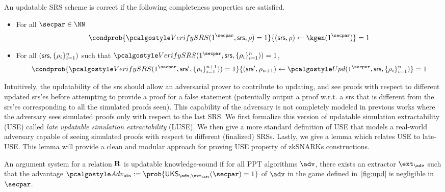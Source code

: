 \begin{definition}
	An updatable SRS scheme is correct if the following completeness properties are satisfied.
	
	\begin{itemize}
		
		\item
		For all $\secpar \in \NN$
		\[
		\condprob{\verifyCRS(1^\secpar,\srs,\rho) = 1}{(\srs,\rho) \leftarrow \kgen(1^\secpar)} = 1
		\]
		\item
		
		For all $(\mathsf{srs},\{\rho_i \}_{i=1}^n)$ such that $\verifyCRS(1^\secpar,\srs,\{\rho_i \}_{i=1}^n))=1$,
		\[
		\condprob{\verifyCRS(1^\secpar,\srs',\{\rho_i \}_{i=1}^{n+1}))=1}{(\srs',\rho_{n+1}) \leftarrow \upd(1^\secpar,\srs,\{\rho_i \}_{i=1}^n)} = 1
		\]
		
	\end{itemize}
\end{definition} 

Intuitively, the updatability of the srs should allow an adversarial prover to contribute to updating, and see proofs with respect to different updated srs'es before attempting to provide a proof for a false statement (potentially output a proof w.r.t. a srs that is different from the srs'es corresponding to all the simulated proofs seen). This capability of the adversary is not completely modeled in previous works where the adversary sees simulated proofs only with respect to the last SRS. We first formalize this version of updatable simulation extractability (USE) called \emph{late updatable simulation extractability} (LUSE). We then give a more standard definition of USE that models a real-world adversary capable of seeing simulated proofs with respect to different (finalized) SRSs.
Lastly, we give a lemma which relates USE to late-USE. This lemma will provide a clean and modular approach for proving USE property of zkSNARKs constructions.


\begin{definition}\label{upd-KS}
	An argument system for a relation $\mathbf{R}$ is updatable knowledge-sound if for all PPT algorithms $\advse$, there exists an extractor $\ext_{\advse}$ such that the advantage $\Adv_{\uks} := \prob{\UKS_{\advse,\ext_{\advse}}(\secpar) = 1}$ of $\advse$ in the game defined in~\cref{fig:upd} is negligible in $\secpar$.
\end{definition}

